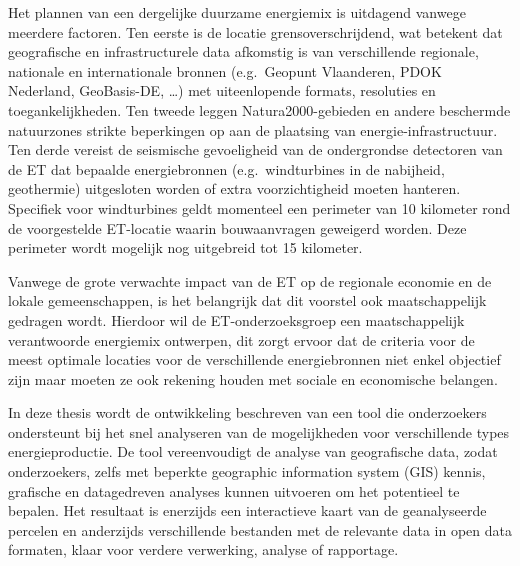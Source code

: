 Het plannen van een dergelijke duurzame energiemix is uitdagend vanwege meerdere factoren. Ten eerste is de locatie grensoverschrijdend, wat betekent dat geografische en infrastructurele data afkomstig is van verschillende regionale, nationale en internationale bronnen (e.g.\ Geopunt Vlaanderen, PDOK Nederland, GeoBasis-DE, \ldots) met uiteenlopende formats, resoluties en toegankelijkheden. Ten tweede leggen Natura2000-gebieden en andere beschermde natuurzones strikte beperkingen op aan de plaatsing van energie-infrastructuur. Ten derde vereist de seismische gevoeligheid van de ondergrondse detectoren van de ET dat bepaalde energiebronnen (e.g.\ windturbines in de nabijheid, geothermie) uitgesloten worden of extra voorzichtigheid moeten hanteren. Specifiek voor windturbines geldt momenteel een perimeter van 10 kilometer rond de voorgestelde ET-locatie waarin bouwaanvragen geweigerd worden. Deze perimeter wordt mogelijk nog uitgebreid tot 15 kilometer.\medskip

Vanwege de grote verwachte impact van de ET op de regionale economie en de lokale gemeenschappen, is het belangrijk dat dit voorstel ook maatschappelijk gedragen wordt. Hierdoor wil de ET-onderzoeksgroep een maatschappelijk verantwoorde energiemix ontwerpen, dit zorgt ervoor dat de criteria voor de meest optimale locaties voor de verschillende energiebronnen niet enkel objectief zijn maar moeten ze ook rekening houden met sociale en economische belangen.\medskip

In deze thesis wordt de ontwikkeling beschreven van een tool die onderzoekers ondersteunt bij het snel analyseren van de mogelijkheden voor verschillende types energieproductie. De tool vereenvoudigt de analyse van geografische data, zodat onderzoekers, zelfs met beperkte geographic information system (GIS) kennis, grafische en datagedreven analyses kunnen uitvoeren om het potentieel te bepalen. Het resultaat is enerzijds een interactieve kaart van de geanalyseerde percelen en anderzijds verschillende bestanden met de relevante data in open data formaten, klaar voor verdere verwerking, analyse of rapportage.\medskip

\section{}\label{sec:probleemstelling}


